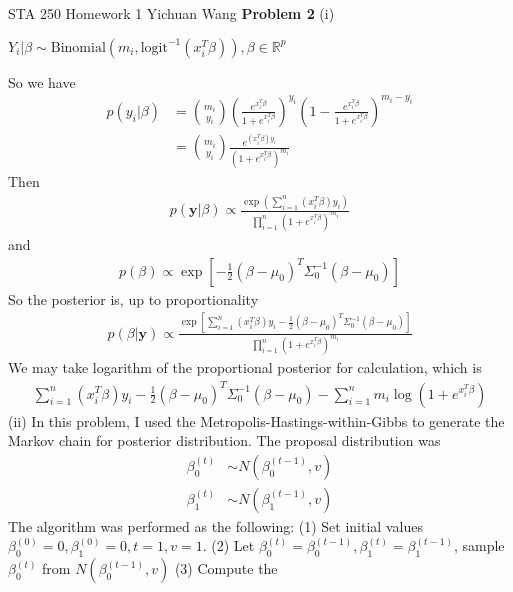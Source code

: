 \documentclass[12pt]{article}
\begin{document}
\noindent STA 250 Homework 1 \newline Yichuan Wang \newline \newline
\textbf{Problem 2} \newline
(i)
\begin{center}
	$Y_i|\beta \sim \text{Binomial}(m_i, \text{logit}^{-1}(x_i^T\beta)), \beta \in \mathbb{R}^p$
\end{center}
So we have
\begin{align*}
	p(y_i|\beta) &= {m_i \choose y_i}(\frac{e^{x_i^T\beta}}{1+e^{x_i^T\beta}})^{y_i}(1 - \frac{e^{x_i^T\beta}}{1+e^{x_i^T\beta}})^{m_i - y_i} \\
	&= {m_i \choose y_i}\frac{e^{(x_i^T\beta)y_i}}{(1+e^{x_i^T\beta})^{m_i}}
\end{align*}
Then
\begin{align*}
	p(\mathbf{y}|\beta) \propto \frac{\exp({\sum_{i=1}^n(x_i^T\beta)y_i})}{\prod_{i=1}^n (1+e^{x_i^T\beta})^{m_i}}
\end{align*}
and
\begin{align*}
	p(\beta) \propto \exp[-\frac{1}{2}(\beta - \mu_0)^T \Sigma_0^{-1} (\beta - \mu_0)]
\end{align*}
So the posterior is, up to proportionality
\begin{align*}
	p(\beta|\mathbf{y}) \propto \frac{\exp[\sum_{i=1}^n(x_i^T\beta)y_i - \frac{1}{2}(\beta - \mu_0)^T \Sigma_0^{-1} (\beta - \mu_0)]}{\prod_{i=1}^n (1+e^{x_i^T\beta})^{m_i}}
\end{align*}
We may take logarithm of the proportional posterior for calculation, which is
\begin{align*}
	\sum_{i=1}^n(x_i^T\beta)y_i - \frac{1}{2}(\beta - \mu_0)^T \Sigma_0^{-1} (\beta - \mu_0) - \sum_{i=1}^n m_i \log(1+e^{x_i^T\beta})
\end{align*}
(ii) In this problem, I used the Metropolis-Hastings-within-Gibbs to generate the Markov chain for posterior distribution. The proposal distribution was
\begin{align*}
	\beta_0^{(t)} &\sim N(\beta_0^{(t-1)}, v) \\
	\beta_1^{(t)} &\sim N(\beta_1^{(t-1)}, v)
\end{align*}
The algorithm was performed as the following: \newline
(1) Set initial values $\beta_0^{(0)} = 0, \beta_1^{(0)} = 0, t = 1, v = 1$. \newline
(2) Let $\beta_0^{(t)} = \beta_0^{(t-1)}, \beta_1^{(t)} = \beta_1^{(t-1)}$, sample $\beta_0^{(t)}$ from $N(\beta_0^{(t-1)}, v)$
(3) Compute the 
\end{document}
